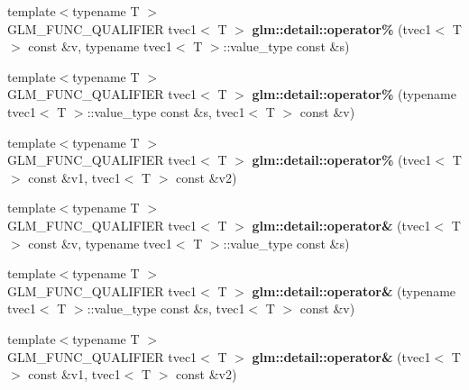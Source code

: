 \begin{DoxyCompactItemize}
\item 
\hypertarget{namespaceglm_1_1detail_afe3345197cfebf3b3c55e2d615776ca6}{{\footnotesize template$<$typename T $>$ }\\\-G\-L\-M\-\_\-\-F\-U\-N\-C\-\_\-\-Q\-U\-A\-L\-I\-F\-I\-E\-R tvec1$<$ \-T $>$ {\bfseries glm\-::detail\-::operator\%} (tvec1$<$ \-T $>$ const \&v, typename tvec1$<$ \-T $>$\-::value\-\_\-type const \&s)}\label{namespaceglm_1_1detail_afe3345197cfebf3b3c55e2d615776ca6}

\item 
\hypertarget{namespaceglm_1_1detail_acb767b9c9d814e3c3fcbff24c3ad782e}{{\footnotesize template$<$typename T $>$ }\\\-G\-L\-M\-\_\-\-F\-U\-N\-C\-\_\-\-Q\-U\-A\-L\-I\-F\-I\-E\-R tvec1$<$ \-T $>$ {\bfseries glm\-::detail\-::operator\%} (typename tvec1$<$ \-T $>$\-::value\-\_\-type const \&s, tvec1$<$ \-T $>$ const \&v)}\label{namespaceglm_1_1detail_acb767b9c9d814e3c3fcbff24c3ad782e}

\item 
\hypertarget{namespaceglm_1_1detail_abb8594c67ded240d2a15ba2459a87091}{{\footnotesize template$<$typename T $>$ }\\\-G\-L\-M\-\_\-\-F\-U\-N\-C\-\_\-\-Q\-U\-A\-L\-I\-F\-I\-E\-R tvec1$<$ \-T $>$ {\bfseries glm\-::detail\-::operator\%} (tvec1$<$ \-T $>$ const \&v1, tvec1$<$ \-T $>$ const \&v2)}\label{namespaceglm_1_1detail_abb8594c67ded240d2a15ba2459a87091}

\item 
\hypertarget{namespaceglm_1_1detail_a4f1e2d9d9ca8fbd5a226683bcbe1a857}{{\footnotesize template$<$typename T $>$ }\\\-G\-L\-M\-\_\-\-F\-U\-N\-C\-\_\-\-Q\-U\-A\-L\-I\-F\-I\-E\-R tvec1$<$ \-T $>$ {\bfseries glm\-::detail\-::operator\&} (tvec1$<$ \-T $>$ const \&v, typename tvec1$<$ \-T $>$\-::value\-\_\-type const \&s)}\label{namespaceglm_1_1detail_a4f1e2d9d9ca8fbd5a226683bcbe1a857}

\item 
\hypertarget{namespaceglm_1_1detail_a29075e784ca50a7e63be34662cb6c225}{{\footnotesize template$<$typename T $>$ }\\\-G\-L\-M\-\_\-\-F\-U\-N\-C\-\_\-\-Q\-U\-A\-L\-I\-F\-I\-E\-R tvec1$<$ \-T $>$ {\bfseries glm\-::detail\-::operator\&} (typename tvec1$<$ \-T $>$\-::value\-\_\-type const \&s, tvec1$<$ \-T $>$ const \&v)}\label{namespaceglm_1_1detail_a29075e784ca50a7e63be34662cb6c225}

\item 
\hypertarget{namespaceglm_1_1detail_abeb95a2e5d0c64e7e90b3a8ee8a3be04}{{\footnotesize template$<$typename T $>$ }\\\-G\-L\-M\-\_\-\-F\-U\-N\-C\-\_\-\-Q\-U\-A\-L\-I\-F\-I\-E\-R tvec1$<$ \-T $>$ {\bfseries glm\-::detail\-::operator\&} (tvec1$<$ \-T $>$ const \&v1, tvec1$<$ \-T $>$ const \&v2)}\label{namespaceglm_1_1detail_abeb95a2e5d0c64e7e90b3a8ee8a3be04}


\end{DoxyCompactItemize}
